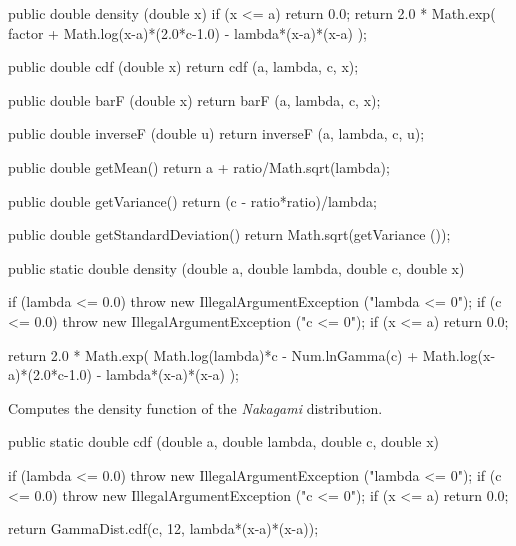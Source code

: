 \begin{code}\begin{hide}

   public double density (double x) {
      if (x <= a) return 0.0;
      return 2.0 * Math.exp( factor
                             + Math.log(x-a)*(2.0*c-1.0)
                             - lambda*(x-a)*(x-a) );
   }

   public double cdf (double x) {
      return cdf (a, lambda, c, x);
   }

   public double barF (double x) {
      return barF (a, lambda, c, x);
   }

   public double inverseF (double u) {
      return inverseF (a, lambda, c, u);
   }

   public double getMean() {
      return a + ratio/Math.sqrt(lambda);
   }

   public double getVariance() {
      return (c - ratio*ratio)/lambda;
   }

   public double getStandardDeviation() {
      return Math.sqrt(getVariance ());
   }\end{hide}

   public static double density (double a, double lambda, double c,
                                 double x)\begin{hide} {
      if (lambda <= 0.0)
         throw new IllegalArgumentException ("lambda <= 0");
      if (c <= 0.0)
         throw new IllegalArgumentException ("c <= 0");
      if (x <= a)
         return 0.0;

      return 2.0 * Math.exp( Math.log(lambda)*c - Num.lnGamma(c)
                             +  Math.log(x-a)*(2.0*c-1.0)
                             - lambda*(x-a)*(x-a) );
   }\end{hide}
\end{code}
\begin{tabb} Computes the density function of the {\em Nakagami\/} distribution.
\end{tabb}
\begin{htmlonly}
\end{htmlonly}
\begin{code}

   public static double cdf (double a, double lambda, double c, double x)\begin{hide} {
      if (lambda <= 0.0)
         throw new IllegalArgumentException ("lambda <= 0");
      if (c <= 0.0)
         throw new IllegalArgumentException ("c <= 0");
      if (x <= a)
         return 0.0;

      return GammaDist.cdf(c, 12, lambda*(x-a)*(x-a));
   }\end{hide}
\end{code}
